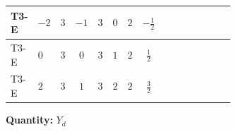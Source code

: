 \documentclass[8pt]{article}
\begin{document}
\begin{landscape}
\begin{longtable}{@{}llcccccc >{\raggedright\arraybackslash}p{0.21\linewidth} >{\raggedright\arraybackslash}p{0.21\linewidth} >{\raggedright\arraybackslash}p{0.21\linewidth}@{}}
\midrule
T3-E & $-2$ & $3$ & $-1$ & $3$ & $0$ & $2$ & $-\frac{1}{2}$ & \scriptsize\adjustbox{max width=\linewidth}{$\begin{gathered} \operatorname{Tr}\!\left({Y_e}\,\left({Y_e}\right)^{\dagger}\right) \left({Y_d}\right)_{ij}\end{gathered}$} & \scriptsize\adjustbox{max width=\linewidth}{$\begin{gathered} +3 \operatorname{Tr}\!\left({Y_u}\,\left({Y_u}\right)^{\dagger}\right) \left({Y_d}\right)_{ij}\end{gathered}$} & \scriptsize\adjustbox{max width=\linewidth}{$\begin{gathered} +3 \operatorname{Tr}\!\left({Y_d}\,\left({Y_d}\right)^{\dagger}\right) \left({Y_d}\right)_{ij}\end{gathered}$} \\
\midrule
T3-E & $0$ & $3$ & $0$ & $3$ & $1$ & $2$ & $\frac{1}{2}$ & \scriptsize\adjustbox{max width=\linewidth}{$\begin{gathered} \operatorname{Tr}\!\left({Y_e}\,\left({Y_e}\right)^{\dagger}\right) \left({Y_d}\right)_{ij}\end{gathered}$} & \scriptsize\adjustbox{max width=\linewidth}{$\begin{gathered} +3 \operatorname{Tr}\!\left({Y_u}\,\left({Y_u}\right)^{\dagger}\right) \left({Y_d}\right)_{ij}\end{gathered}$} & \scriptsize\adjustbox{max width=\linewidth}{$\begin{gathered} +3 \operatorname{Tr}\!\left({Y_d}\,\left({Y_d}\right)^{\dagger}\right) \left({Y_d}\right)_{ij}\end{gathered}$} \\
\midrule
T3-E & $2$ & $3$ & $1$ & $3$ & $2$ & $2$ & $\frac{3}{2}$ & \scriptsize\adjustbox{max width=\linewidth}{$\begin{gathered} \operatorname{Tr}\!\left({Y_e}\,\left({Y_e}\right)^{\dagger}\right) \left({Y_d}\right)_{ij}\end{gathered}$} & \scriptsize\adjustbox{max width=\linewidth}{$\begin{gathered} +3 \operatorname{Tr}\!\left({Y_u}\,\left({Y_u}\right)^{\dagger}\right) \left({Y_d}\right)_{ij}\end{gathered}$} & \scriptsize\adjustbox{max width=\linewidth}{$\begin{gathered} +3 \operatorname{Tr}\!\left({Y_d}\,\left({Y_d}\right)^{\dagger}\right) \left({Y_d}\right)_{ij}\end{gathered}$} \\
\midrule
\bottomrule
\end{longtable}
\clearpage
\noindent\textbf{Quantity: }$Y_d$\par\smallskip

\end{landscape}
\end{document}
